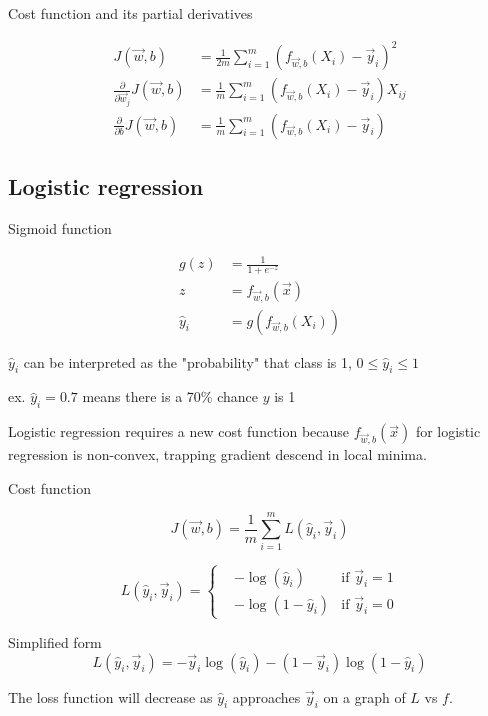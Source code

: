 \documentclass[12pt]{article}
\begin{document}
Cost function and its partial derivatives

\begin{align*}
    J(\vec{w},b) &= \frac{1}{2m} \sum_{i=1}^{m} (f_{\vec{w},b}(X_i) - \vec{y}_i)^2\\
    \frac{\partial}{\partial \vec{w}_j} J(\vec{w},b) &= \frac{1}{m} \sum_{i=1}^{m} (f_{\vec{w},b}(X_i) - \vec{y}_i) X_{ij}\\
    \frac{\partial}{\partial b} J(\vec{w},b) &= \frac{1}{m} \sum_{i=1}^{m} (f_{\vec{w},b}(X_i) - \vec{y}_i)
\end{align*}

\subsection{Logistic regression}

Sigmoid function

\begin{align*}
    g(z) &= \frac{1}{1 + e^{-z}}\\
    z &= f_{\vec{w},b}(\vec{x})\\
    \hat{y}_i &= g(f_{\vec{w},b}(X_i))
\end{align*}

$\hat{y}_i$ can be interpreted as the "probability" that class is 1, $0 \leq \hat{y}_i \leq 1$

ex. $\hat{y}_i = 0.7$ means there is a 70\% chance $y$ is 1

Logistic regression requires a new cost function because $f_{\vec{w},b}(\vec{x})$ for logistic regression is non-convex, trapping gradient descend in local minima.

Cost function

\[ J(\vec{w},b) = \frac{1}{m} \sum_{i=1}^{m} L(\hat{y}_i,\vec{y}_i) \]

\begin{equation*}
L(\hat{y}_i,\vec{y}_i) = 
  \left\{
    \begin{aligned}
      & -\log(\hat{y}_i) & \text{if } \vec{y}_i = 1 \\
      & -\log(1 - \hat{y}_i) & \text{if } \vec{y}_i = 0
    \end{aligned}
  \right.
\end{equation*}

Simplified form
\[ L(\hat{y}_i, \vec{y}_i) = -\vec{y}_i \log(\hat{y}_i) - (1 - \vec{y}_i) \log (1 - \hat{y}_i) \]

The loss function will decrease as $\hat{y}_i$ approaches $\vec{y}_i$ on a graph of $L$ vs $f$.
\end{document}
